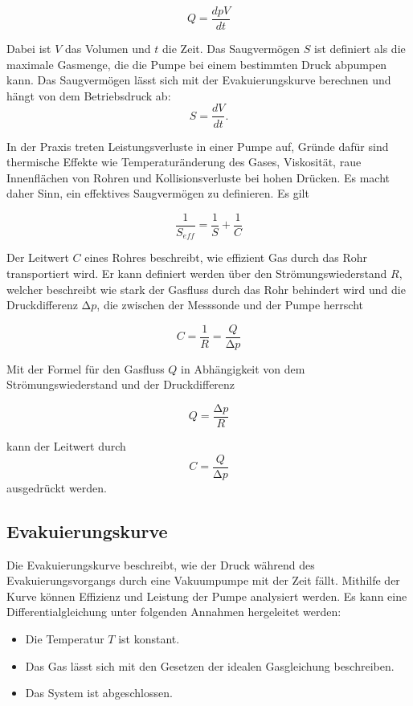 \begin{equation}
    Q=\frac{dpV}{dt}
    \label{eq:saugleistung}
\end{equation}

Dabei ist \( V \) das Volumen und \( t \) die Zeit.
Das Saugvermögen $S$ ist definiert als die maximale Gasmenge, die die Pumpe bei einem bestimmten Druck abpumpen kann. Das Saugvermögen lässt sich 
mit der Evakuierungskurve berechnen und hängt von dem Betriebsdruck ab:
\begin{equation}
    S=\frac{dV}{dt}.
    \label{eq:saugvermögen}
\end{equation} 

In der Praxis treten Leistungsverluste in einer Pumpe auf, Gründe dafür sind thermische Effekte wie Temperaturänderung des Gases,
Viskosität, raue Innenflächen von Rohren und Kollisionsverluste bei hohen Drücken. Es macht daher Sinn, ein effektives Saugvermögen zu definieren.
Es gilt \cite{Grundlagen der Vakuumtechnik}

\begin{equation}
    \frac{1}{S_{eff}}=\frac{1}{S}+\frac{1}{C}
    \label{eq:effektives_saugvermögen}
\end{equation}   

Der Leitwert \( C \) eines Rohres beschreibt, wie effizient Gas durch das Rohr transportiert wird. Er kann definiert werden über 
den Strömungswiederstand \( R \), welcher beschreibt wie stark der Gasfluss durch das Rohr behindert wird 
und die Druckdifferenz \(\increment p\), die zwischen der Messsonde und der Pumpe herrscht

\begin{equation}
    C=\frac{1}{R}=\frac{Q}{\increment p}
    \label{eq:leitwert1}
\end{equation}

Mit der Formel für den Gasfluss \( Q \) in Abhängigkeit von dem Strömungswiederstand und der Druckdifferenz

\begin{equation}
    Q=\frac{\increment p}{R}
    \label{eq:strömungswiderstand1}
\end{equation}

kann der Leitwert durch
\begin{equation}
    C=\frac{Q}{\increment p}
    \label{eq:leitwert2}
\end{equation} 
ausgedrückt werden.

\subsection{Evakuierungskurve}
Die Evakuierungskurve beschreibt, wie der Druck während des Evakuierungsvorgangs durch eine Vakuumpumpe 
mit der Zeit fällt. Mithilfe der Kurve können Effizienz und Leistung der Pumpe analysiert werden.
Es kann eine Differentialgleichung unter folgenden Annahmen hergeleitet werden:
\begin{itemize}
\item Die Temperatur \(T \) ist konstant. 
\item Das Gas lässt sich mit den Gesetzen der idealen Gasgleichung beschreiben.
\item Das System ist abgeschlossen.
\end{itemize}


